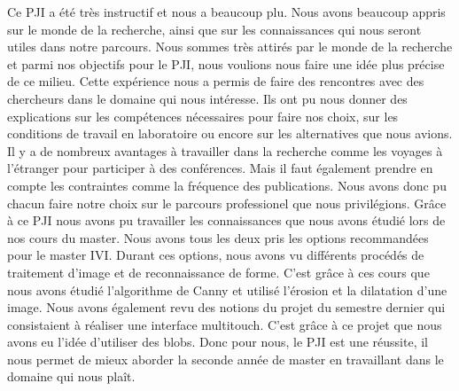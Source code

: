 Ce PJI a été très instructif et nous a beaucoup plu. Nous avons beaucoup appris sur le monde 
de la recherche, ainsi que sur les connaissances qui nous seront utiles dans notre parcours.
Nous sommes très attirés par le monde de la recherche et parmi nos objectifs pour le PJI, nous voulions 
nous faire une idée plus précise de ce milieu. Cette expérience nous a permis de faire des rencontres
avec des chercheurs dans le domaine qui nous intéresse. Ils ont pu nous donner des explications
sur les compétences nécessaires pour faire nos choix, sur les conditions de travail en laboratoire 
ou encore sur les alternatives que nous avions. Il y a de nombreux avantages à travailler dans la recherche
comme les voyages à l'étranger pour participer à des conférences. Mais il faut également prendre en compte les contraintes
comme la fréquence des publications. Nous avons donc pu chacun faire notre choix sur le parcours professionel
que nous privilégions.
Grâce à ce PJI nous avons pu travailler les connaissances que nous avons étudié lors de nos cours du master.
Nous avons tous les deux pris les options recommandées pour le master IVI. Durant ces options, nous avons 
vu différents procédés de traitement d'image et de reconnaissance de forme. C'est grâce à ces cours que nous
avons étudié l'algorithme de Canny et utilisé l'érosion et la dilatation d'une image. Nous avons également
revu des notions du projet du semestre dernier qui consistaient à réaliser une interface multitouch. C'est grâce
à ce projet que nous avons eu l'idée d'utiliser des blobs. Donc pour nous, le PJI est une réussite, il nous permet de 
mieux aborder la seconde année de master en travaillant dans le domaine qui nous plaît.
\newpage